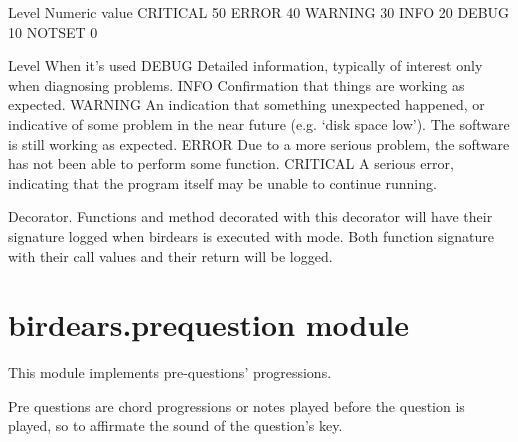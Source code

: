 \documentclass[letterpaper,10pt,english]{sphinxmanual}
\begin{document}
%
\begin{sphinxVerbatim}[commandchars=\\\{\}]
Level       Numeric value
\PYGZhy{}\PYGZhy{}\PYGZhy{}\PYGZhy{}\PYGZhy{}       \PYGZhy{}\PYGZhy{}\PYGZhy{}\PYGZhy{}\PYGZhy{}\PYGZhy{}\PYGZhy{}\PYGZhy{}\PYGZhy{}\PYGZhy{}\PYGZhy{}\PYGZhy{}\PYGZhy{}
CRITICAL    50
ERROR       40
WARNING     30
INFO        20
DEBUG       10
NOTSET      0

Level       When it’s used
\PYGZhy{}\PYGZhy{}\PYGZhy{}\PYGZhy{}\PYGZhy{}       \PYGZhy{}\PYGZhy{}\PYGZhy{}\PYGZhy{}\PYGZhy{}\PYGZhy{}\PYGZhy{}\PYGZhy{}\PYGZhy{}\PYGZhy{}\PYGZhy{}\PYGZhy{}\PYGZhy{}\PYGZhy{}
DEBUG       Detailed information, typically of interest only when
                diagnosing problems.
INFO        Confirmation that things are working as expected.
WARNING     An indication that something unexpected happened, or indicative
                of some problem in the near future (e.g. ‘disk space low’).
                The software is still working as expected.
ERROR       Due to a more serious problem, the software has not been able
                to perform some function.
CRITICAL    A serious error, indicating that the program itself may be
                unable to continue running.
\end{sphinxVerbatim}

\begin{fulllineitems}
\label{\detokenize{birdears:birdears.logger.log_event}}
Decorator. Functions and method decorated with this decorator will have
their signature logged when birdears is executed with  mode. Both
function signature with their call values and their return will be logged.

\end{fulllineitems}



\section{birdears.prequestion module}
\label{\detokenize{birdears:birdears-prequestion-module}}\label{\detokenize{birdears:module-birdears.prequestion}}
This module implements pre-questions’ progressions.

Pre questions are chord progressions or notes played before the question is
played, so to affirmate the sound of the question’s key.
\end{document}
